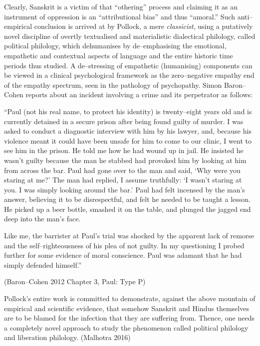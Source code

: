 Clearly, Sanskrit is a victim of that “othering” process and claiming it as an instrument of oppression is an “attributional bias” and thus “amoral.” Such anti–empirical conclusion is arrived at by Pollock, a mere \textit{classicist}, using a putatively novel discipline of overtly textualised and materialistic dialectical philology, called political philology, which dehumanises by de–emphasising the emotional, empathetic and contextual aspects of language and the entire historic time periods thus studied. A de–stressing of empathetic (humanising) components can be viewed in a clinical psychological framework as the zero–negative empathy end of the empathy spectrum, seen in the pathology of psychopathy. Simon Baron–Cohen reports about an incident involving a crime and its perpetrator as follows:

\begin{myquote}
“Paul (not his real name, to protect his identity) is twenty–eight years old and is currently detained in a secure prison after being found guilty of murder. I was asked to conduct a diagnostic interview with him by his lawyer, and, because his violence meant it could have been unsafe for him to come to our clinic, I went to see him in the prison. He told me how he had wound up in jail. He insisted he wasn’t guilty because the man he stabbed had provoked him by looking at him from across the bar. Paul had gone over to the man and said, ‘Why were you staring at me?’ The man had replied, I assume truthfully: ‘I wasn’t staring at you. I was simply looking around the bar.’ Paul had felt incensed by the man’s answer, believing it to be disrespectful, and felt he needed to be taught a lesson. He picked up a beer bottle, smashed it on the table, and plunged the jagged end deep into the man’s face.
\end{myquote}

\begin{myquote}
Like me, the barrister at Paul’s trial was shocked by the apparent lack of remorse and the self–righteousness of his plea of not guilty. In my questioning I probed further for some evidence of moral conscience. Paul was adamant that he had simply defended himself.” 
\begin{myquote}
(Baron–Cohen 2012 Chapter 3, Paul: Type P)
\end{myquote}
\end{myquote}

Pollock's entire work is committed to demonstrate, against the above mountain of empirical and scientific evidence, that somehow Sanskrit and Hindus themselves are to be blamed for the infection that they are suffering from. Thence, one needs a completely novel approach to study the phenomenon called political philology and liberation philology. (Malhotra 2016)

